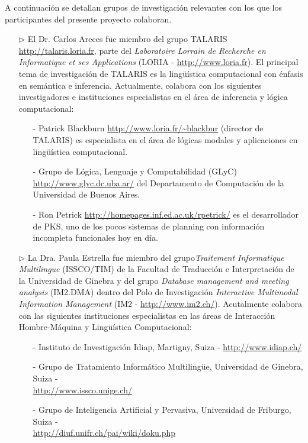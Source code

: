 A continuaci\'on se detallan grupos de investigaci\'on relevantes con los que los  participantes del presente proyecto colaboran.


\begin{itemize}
    \item[$\triangleright$] El Dr. Carlos Areces fue miembro
del grupo TALARIS \url{http://talaris.loria.fr}, parte del
\textit{Laboratoire Lorrain de Recherche en Informatique et ses Applications} (LORIA - \url{http://www.loria.fr}). El principal tema de investigaci\'on de TALARIS es la ling\"u\'istica computacional con \'enfasis en sem\'antica e inferencia. Actualmente, colabora con los siguientes investigadores e instituciones especialistas en el \'area de inferencia y l\'ogica computacional:
\begin{itemize}
    \item[-]  Patrick Blackburn \url{http://www.loria.fr/~blackbur} (director de TALARIS) es especialista en el \'area de l\'ogicas modales y aplicaciones
en ling\"u\'istica computacional.
\item[-] Grupo de L\'ogica, Lenguaje y Computabilidad (GLyC) \url{http://www.glyc.dc.uba.ar/} del Departamento de Computaci\'on de la Universidad
de Buenos Aires.
\item[-] Ron Petrick \url{http://homepages.inf.ed.ac.uk/rpetrick/} es el
desarrollador de PKS, uno de los pocos sistemas de planning con informaci\'on
incompleta funcionales hoy en d\'ia.
\end{itemize}

\item[$\triangleright$] La Dra. Paula Estrella fue miembro del grupo\textit{Traitement Informatique Multilingue} (ISSCO/TIM) de la Facultad de Traducci\'on e Interpretaci\'on de la Universidad de Ginebra y del grupo \textit{Database management and meeting analysis} (IM2.DMA) dentro del Polo de Investigaci\'on \textit{Interactive Multimodal Information Management} (IM2 - \url{http://www.im2.ch/}). Acutalmente colabora con las siguientes instituciones especialistas en las \'areas de Interacci\'on Hombre-M\'aquina y  Ling\"u\'istica Computacional:
\begin{itemize}
    \item[-]  Instituto de Investigaci\'on Idiap, Martigny, Suiza -  \url{http://www.idiap.ch/}
\item[-] Grupo de Tratamiento Inform\'atico Multiling\"ue, Universidad de Ginebra, Suiza - \\ \url{http://www.issco.unige.ch/}
\item[-]  Grupo de Inteligencia Artificial y Pervasiva, Universidad de Friburgo, Suiza - \\ \url{http://diuf.unifr.ch/pai/wiki/doku.php}
\end{itemize}


\end{itemize}
